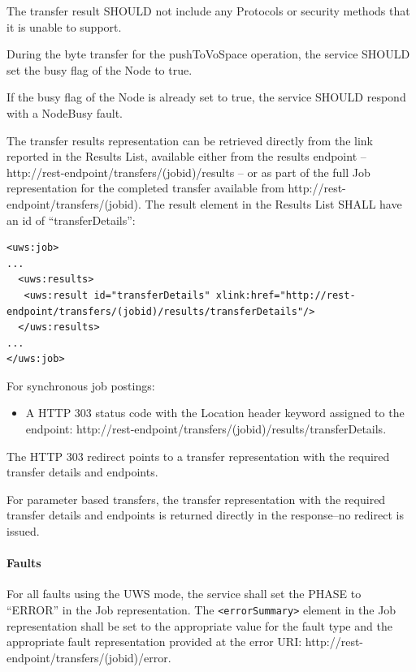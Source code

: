 \documentclass[11pt,a4paper]{ivoa}
\begin{document}
The transfer result SHOULD not include any Protocols or security methods that it is unable to support.

During the byte transfer for the pushToVoSpace operation, the service SHOULD set the busy flag of the Node to true.

If the busy flag of the Node is already set to true, the service SHOULD respond with a NodeBusy fault.

The transfer results representation can be retrieved directly from the link reported in the Results List, available either from the results endpoint -- http://rest-endpoint/transfers/(jobid)/results -- or as part of the full Job representation for the completed transfer available from http://rest-endpoint/transfers/(jobid). The result element in the Results List SHALL have an id of ``transferDetails'':
\begin{lstlisting}
<uws:job>
...
  <uws:results>
   <uws:result id="transferDetails" xlink:href="http://rest-endpoint/transfers/(jobid)/results/transferDetails"/>
  </uws:results>
...
</uws:job>
\end{lstlisting}
For synchronous job postings:
\begin{itemize}
    \item A HTTP 303 status code with the Location header keyword assigned to the endpoint: http://rest-endpoint/transfers/(jobid)/results/transferDetails.
\end{itemize}
The HTTP 303 redirect points to a transfer representation with the required transfer details and endpoints.

For parameter based transfers, the transfer representation with the required transfer details and endpoints is returned directly in the response--no redirect is issued.

\paragraph{Faults}
For all faults using the UWS mode, the service shall set the PHASE to ``ERROR'' in the Job representation. The \verb|<errorSummary>| element in the Job representation shall be set to the appropriate value for the fault type and the appropriate fault representation provided at the error URI: http://rest-endpoint/transfers/(jobid)/error.
\end{document}
